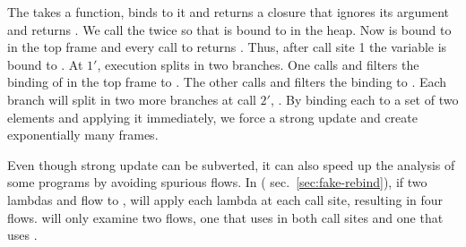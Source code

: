 \documentclass{LMCS}
\theoremstyle{definition} \newtheorem{property}[thm]{Property}
\begin{document}
The  takes a function, binds  to it and returns a closure that
ignores its argument and returns .
We call the  twice so that  is bound to 
 in the heap.
Now  is bound to  in the top frame and every call to 
returns .
Thus, after call site 1 the variable  is bound to 
.
At $1'$, execution splits in two branches.
One calls  and filters the binding of  in the top frame to
.
The other calls  and filters the binding to .
Each branch will split in two more branches at call $2'$, \etc.
By binding each  to a set of two elements and applying it immediately, we
force a strong update and create exponentially many frames.

Even though strong update can be subverted, it can also speed up the analysis
of some programs by avoiding spurious flows. 
In  (\confer{} sec.~\ref{sec:fake-rebind}), if two
lambdas  and  flow to ,  will apply each lambda
at each call site, resulting in four flows.
\cfat{} will only examine two flows, one that uses  in both call sites
and one that uses .
\end{document}
